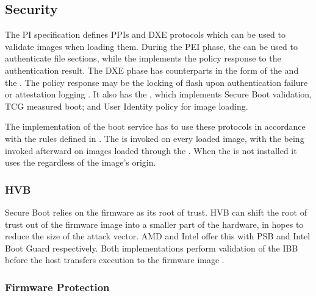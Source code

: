 
\subsection{Security}
\label{sec:uefi-pi:pi:security}

The \ac{PI} specification defines \acp{PPI} and \ac{DXE} protocols which can be used to validate images when loading them.
During the \ac{PEI} phase, the  can be used to authenticate file sections, while the  implements the policy response to the authentication result.
The \ac{DXE} phase has counterparts in the form of the  and the .
The policy response may be the locking of flash upon authentication failure or attestation logging \cite[Vol. 2, Section 12.9.1]{pi-spec}.
It also has the , which implements Secure Boot validation, \ac{TCG} measured boot; and User Identity policy for image loading.

The implementation of the boot service  has to use these protocols in accordance with the rules defined in \cite[Vol. 2, Section 12.9.2]{pi-spec}.
The   is invoked on every loaded image, with the  being invoked afterward on images loaded through the .
When the   is not installed it uses the  regardless of the image's origin.

\subsubsection{\acf{HVB}}

Secure Boot relies on the firmware as its root of trust.
\ac{HVB} can shift the root of trust out of the firmware image into a smaller part of the hardware, in hopes to reduce the size of the attack vector.
\ac{AMD} and Intel offer this with \ac{PSB} and Intel Boot Guard respectively.
Both implementations perform validation of the \ac{IBB} before the host  transfers execution to the firmware image \cite{tianocore-understanding-uefi-secure-boot-chain,anchoring-trust}.

\subsubsection{Firmware Protection}

